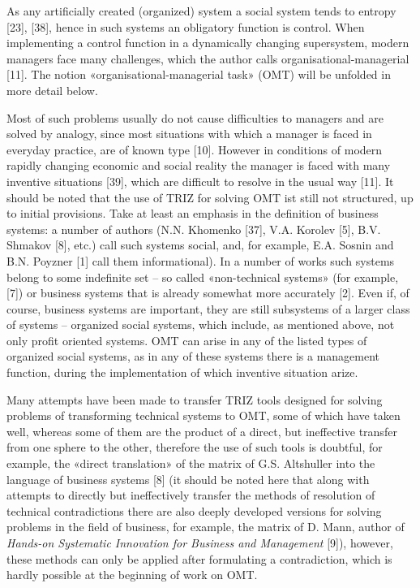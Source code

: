 \documentclass[11pt,a4paper]{book}
\begin{document}
As any artificially created (organized) system a social system tends to
entropy [23], [38], hence in such systems an obligatory function is control.
When implementing a control function in a dynamically changing supersystem,
modern managers face many challenges, which the author calls
organisational-managerial [11]. The notion «organisational-managerial task»
(OMT) will be unfolded in more detail below.

Most of such problems usually do not cause difficulties to managers and are
solved by analogy, since most situations with which a manager is faced in
everyday practice, are of known type [10]. However in conditions of modern
rapidly changing economic and social reality the manager is faced with many
inventive situations [39], which are difficult to resolve in the usual way
[11].  It should be noted that the use of TRIZ for solving OMT ist still not
structured, up to initial provisions. Take at least an emphasis in the
definition of business systems: a number of authors (N.N. Khomenko [37],
V.A. Korolev [5], B.V. Shmakov [8], etc.) call such systems social, and, for
example, E.A. Sosnin and B.N. Poyzner [1] call them informational).  In a
number of works such systems belong to some indefinite set -- so called
«non-technical systems» (for example, [7]) or business systems that is already
somewhat more accurately [2]. Even if, of course, business systems are
important, they are still subsystems of a larger class of systems -- organized
social systems, which include, as mentioned above, not only profit oriented
systems. OMT can arise in any of the listed types of organized social systems,
as in any of these systems there is a management function, during the
implementation of which inventive situation arize.

Many attempts have been made to transfer TRIZ tools designed for solving
problems of transforming technical systems to OMT, some of which have taken
well, whereas some of them are the product of a direct, but ineffective
transfer from one sphere to the other, therefore the use of such tools is
doubtful, for example, the «direct translation» of the matrix of
G.S. Altshuller into the language of business systems [8] (it should be noted
here that along with attempts to directly but ineffectively transfer the
methods of resolution of technical contradictions there are also deeply
developed versions for solving problems in the field of business, for example,
the matrix of D. Mann, author of \emph{Hands-on Systematic Innovation for
  Business and Management} [9]), however, these methods can only be applied
after formulating a contradiction, which is hardly possible at the beginning
of work on OMT.
\end{document}
